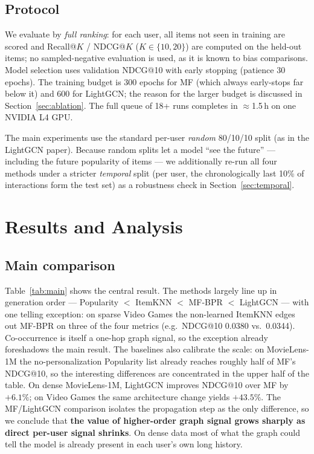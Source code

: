 \documentclass[11pt]{article}
\begin{document}
\subsection{Protocol}

We evaluate by \emph{full ranking}: for each user, all items not seen in
training are scored and Recall@$K$ / NDCG@$K$ ($K\in\{10,20\}$) are computed
on the held-out items; no sampled-negative evaluation is used, as it is known
to bias comparisons. Model selection uses validation NDCG@10 with early
stopping (patience 30 epochs). The training budget is 300 epochs for MF
(which always early-stops far below it) and 600 for LightGCN; the reason for
the larger budget is discussed in Section~\ref{sec:ablation}. The full queue
of 18+ runs completes in $\approx$1.5\,h on one NVIDIA L4 GPU.

The main experiments use the standard per-user \emph{random} 80/10/10 split
(as in the LightGCN paper). Because random splits let a model ``see the
future'' --- including the future popularity of items --- we additionally
re-run all four methods under a stricter \emph{temporal} split (per user, the
chronologically last 10\% of interactions form the test set) as a robustness
check in Section~\ref{sec:temporal}.

\section{Results and Analysis}

\subsection{Main comparison}

\begin{table}[h]\centering

\caption{Test-set results (R = Recall, N = NDCG; $d{=}64$ for the learned
models). The method generations improve in order on both datasets; LightGCN
wins everywhere, but its gain over MF is $\sim$7$\times$ larger on the sparse
dataset.}
\label{tab:main}
\end{table}

Table~\ref{tab:main} shows the central result. The methods largely line up
in generation order --- Popularity $<$ ItemKNN $<$ MF-BPR $<$ LightGCN ---
with one telling exception: on sparse Video Games the non-learned ItemKNN
edges out MF-BPR on three of the four metrics (e.g.\ NDCG@10 0.0380 vs.\
0.0344). Co-occurrence is itself a one-hop graph signal, so the exception
already foreshadows the main result. The baselines also calibrate the scale: on MovieLens-1M the
no-personalization Popularity list already reaches roughly half of MF's
NDCG@10, so the interesting differences are concentrated in the upper half of
the table. On dense MovieLens-1M, LightGCN improves NDCG@10 over MF by
$+6.1\%$; on Video Games the same architecture change yields $+43.5\%$. The
MF/LightGCN comparison isolates the propagation step as the only difference,
so we conclude that \textbf{the value of higher-order graph signal grows
sharply as direct per-user signal shrinks}. On dense data most of what the
graph could tell the model is already present in each user's own long
history.
\end{document}
